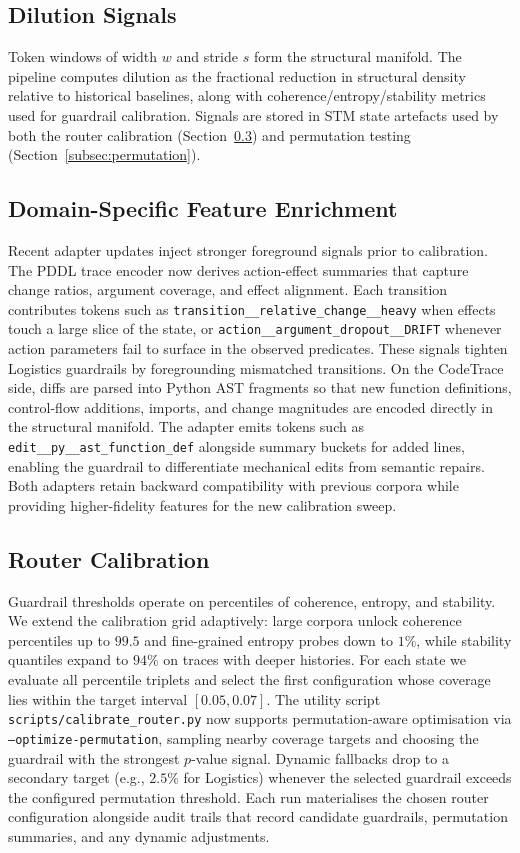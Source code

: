 \documentclass[11pt]{article}
\begin{document}
\subsection{Dilution Signals}
Token windows of width $w$ and stride $s$ form the structural manifold. The
pipeline computes dilution as the fractional reduction in structural density
relative to historical baselines, along with coherence/entropy/stability metrics
used for guardrail calibration. Signals are stored in STM state artefacts used by
both the router calibration (Section~\ref{subsec:calibration}) and permutation
testing (Section~\ref{subsec:permutation}).

\subsection{Domain-Specific Feature Enrichment}
Recent adapter updates inject stronger foreground signals prior to calibration.
The PDDL trace encoder now derives action-effect summaries that capture change
ratios, argument coverage, and effect alignment. Each transition contributes
tokens such as \texttt{transition\_\_relative\_change\_\_heavy} when effects
touch a large slice of the state, or \texttt{action\_\_argument\_dropout\_\_DRIFT}
whenever action parameters fail to surface in the observed predicates. These
signals tighten Logistics guardrails by foregrounding mismatched transitions.
On the CodeTrace side, diffs are parsed into Python AST fragments so that new
function definitions, control-flow additions, imports, and change magnitudes are
encoded directly in the structural manifold. The adapter emits tokens such as
\texttt{edit\_\_py\_\_ast\_function\_def} alongside summary buckets for added
lines, enabling the guardrail to differentiate mechanical edits from semantic
repairs. Both adapters retain backward compatibility with previous corpora
while providing higher-fidelity features for the new calibration sweep.

\subsection{Router Calibration}
\label{subsec:calibration}
Guardrail thresholds operate on percentiles of coherence, entropy, and stability.
We extend the calibration grid adaptively: large corpora unlock coherence
percentiles up to $99.5$ and fine-grained entropy probes down to $1\%$, while
stability quantiles expand to $94\%$ on traces with deeper histories. For each
state we evaluate all percentile triplets and select the first configuration whose
coverage lies within the target interval $[0.05, 0.07]$. The utility script
\texttt{scripts/calibrate\_router.py} now supports permutation-aware
optimisation via \texttt{--optimize-permutation}, sampling nearby coverage
targets and choosing the guardrail with the strongest $p$-value signal. Dynamic
fallbacks drop to a secondary target (e.g., $2.5\%$ for Logistics) whenever the
selected guardrail exceeds the configured permutation threshold. Each run
materialises the chosen router configuration alongside audit trails that record
candidate guardrails, permutation summaries, and any dynamic adjustments.
\end{document}
